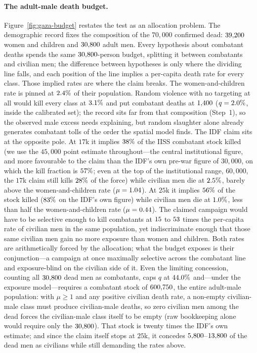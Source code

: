\paragraph{The adult-male death budget.} Figure~\ref{fig:gaza-budget} restates the test as an allocation problem. The demographic record fixes the composition of the $70{,}000$ confirmed dead: $39{,}200{}$ women and children and $30{,}800{}$ adult men. Every hypothesis about combatant deaths spends the same $30{,}800{}$-person budget, splitting it between combatants and civilian men; the difference between hypotheses is only where the dividing line falls, and each position of the line implies a per-capita death rate for every class. Those implied rates are where the claim breaks. The women-and-children rate is pinned at $2.4{}\%$ of their population. Random violence with no targeting at all would kill every class at $3.1{}\%$ and put combatant deaths at $1{,}400{}$ ($q=2.0{}\%$, inside the calibrated set); the record sits far from that composition (Step~1), so the observed male excess needs explaining, but random slaughter alone already generates combatant tolls of the order the spatial model finds. The IDF claim sits at the opposite pole. At $17$k it implies $38{}\%$ of the IISS combatant stock killed (we use the $45{,}000$ point estimate throughout---the central institutional figure, and more favourable to the claim than the IDF's own pre-war figure of $30{,}000$, on which the kill fraction is $57{}\%$; even at the top of the institutional range, $60{,}000$, the $17$k claim still kills $28{}\%$ of the force) while civilian men die at $2.5{}\%$, barely above the women-and-children rate ($\mu=1.04{}$). At $25$k it implies $56{}\%$ of the stock killed ($83{}\%$ on the IDF's own figure) while civilian men die at $1.0{}\%$, less than half the women-and-children rate ($\mu=0.44{}$). The claimed campaign would have to be selective enough to kill combatants at $15{}$ to $53{}$ times the per-capita rate of civilian men in the same population, yet indiscriminate enough that those same civilian men gain no more exposure than women and children. Both rates are arithmetically forced by the allocation; what the budget exposes is their conjunction---a campaign at once maximally selective across the combatant line and exposure-blind on the civilian side of it. Even the limiting concession, counting all $30{,}800{}$ dead men as combatants, caps $q$ at $44.0{}\%$ and---under the exposure model---requires a combatant stock of $600{,}750{}$, the entire adult-male population: with $\mu\ge 1$ and any positive civilian death rate, a non-empty civilian-male class must produce civilian-male deaths, so zero civilian men among the dead forces the civilian-male class itself to be empty (raw bookkeeping alone would require only the $30{,}800{}$). That stock is twenty times the IDF's own estimate; and since the claim itself stops at $25$k, it concedes $5{,}800{}$--$13{,}800{}$ of the dead men as civilians while still demanding the rates above.

